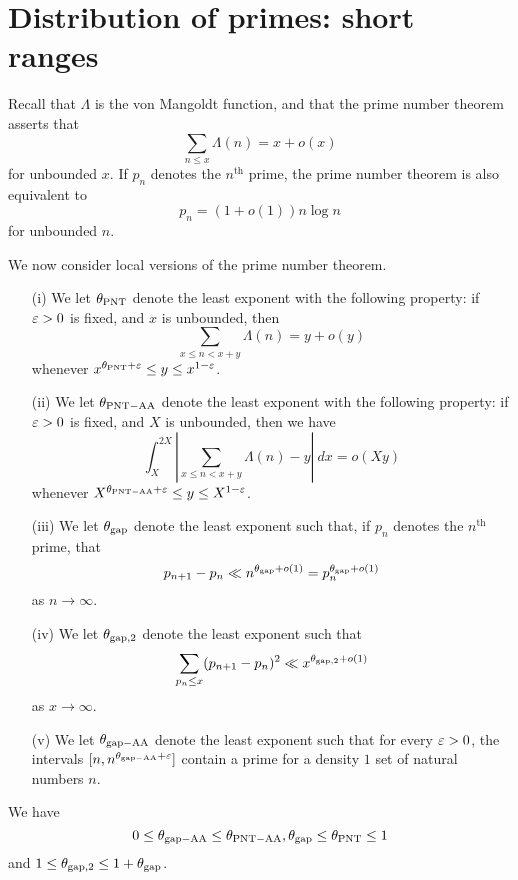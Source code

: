 \chapter{Distribution of primes: short ranges}\label{primes-sec}

Recall that $\Lambda$ is the von Mangoldt function, and that the prime number theorem asserts that
$$ \sum_{n \leq x} \Lambda(n) = x + o(x)$$
for unbounded $x$.  If $p_n$ denotes the $n^{\mathrm{th}}$ prime, the prime number theorem is also equivalent to
$$ p_n = (1+o(1)) n \log n$$
for unbounded $n$.

We now consider local versions of the prime number theorem.

\begin{definition}\label{pnt-ap}
    \begin{itemize}
        \item[(i)] We let $\theta_{\mathrm{PNT}}$ denote the least exponent with the following property: if $\varepsilon > 0$ is fixed, and $x$ is unbounded, then
        $$ \sum_{x \leq n < x+y} \Lambda(n) = y + o(y)$$
        whenever $x^{\theta_{\mathrm{PNT}} + \varepsilon} \leq y \leq x^{1-\varepsilon}$.
        \item[(ii)] We let $\theta_{\mathrm{PNT-AA}}$ denote the least exponent with the following property: if $\varepsilon > 0$ is fixed, and $X$ is unbounded, then we have
        $$ \int_X^{2X} |\sum_{x \leq n < x+y} \Lambda(n)-y|\ dx = o(Xy)$$
        whenever $X^{\theta_{\mathrm{PNT-AA}} + \varepsilon} \leq y \leq X^{1-\varepsilon}$.
        \item[(iii)] We let $\theta_{\mathrm{gap}}$ denote the least exponent such that, if $p_n$ denotes the $n^{\mathrm{th}}$ prime, that
        $$ p_{n+1} - p_n \ll n^{\theta_{\mathrm{gap}}+o(1)} = p_n^{\theta_{\mathrm{gap}}+o(1)}$$
        as $n \to \infty$.
        \item[(iv)] We let $\theta_{\mathrm{gap},2}$ denote the least exponent such that
        $$ \sum_{p_n \leq x} (p_{n+1}-p_n)^2 \ll x^{\theta_{\mathrm{gap},2}+o(1)}$$
        as $x \to \infty$.
        \item[(v)] We let $\theta_{\mathrm{gap-AA}}$ denote the least exponent such that for every $\varepsilon>0$, the intervals $[n, n^{\theta_{\mathrm{gap-AA}}+\varepsilon}]$ contain a prime for a density $1$ set of natural numbers $n$.
    \end{itemize}
\end{definition}

\begin{lemma}\label{pnt-triv}
    We have
    $$ 0 \leq \theta_{\mathrm{gap-AA}} \leq \theta_{\mathrm{PNT-AA}}, \theta_{\mathrm{gap}} \leq \theta_{\mathrm{PNT}} \leq 1$$
    and $1 \leq \theta_{\mathrm{gap},2} \leq 1+\theta_{\mathrm{gap}}$.
\end{lemma}

